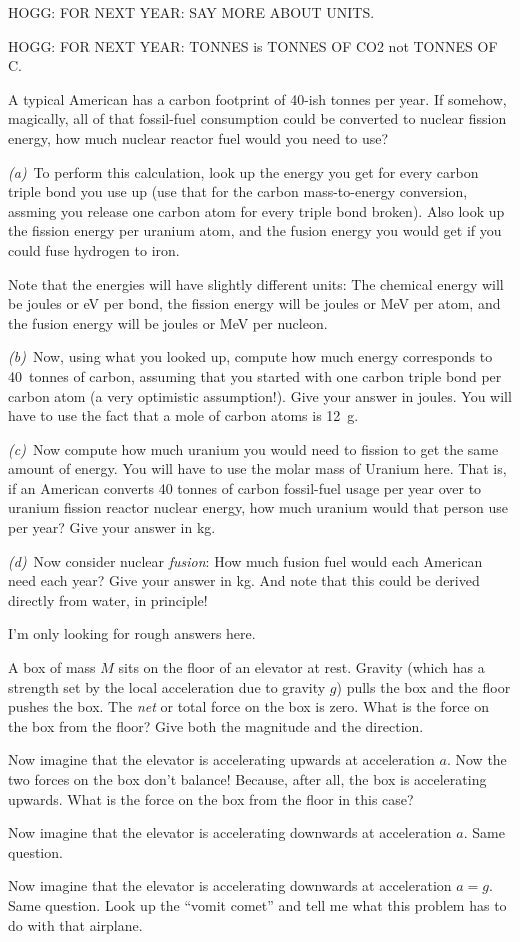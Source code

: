 \documentclass[12pt, letterpaper]{article}
\begin{document}
\begin{problem}
  HOGG: FOR NEXT YEAR: SAY MORE ABOUT UNITS.

  HOGG: FOR NEXT YEAR: TONNES is TONNES OF CO2 not TONNES OF C.

A typical American has a carbon footprint of 40-ish tonnes per year.
If somehow, magically, all of that fossil-fuel consumption could be
converted to nuclear fission energy, how much nuclear reactor fuel
would you need to use?

\textsl{(a)}~To perform this calculation, look up the energy you
get for every carbon triple bond you use up (use that for the carbon
mass-to-energy conversion, assming you release one carbon atom for
every triple bond broken). Also look up the fission energy
per uranium atom, and the fusion energy you would get if you could fuse
hydrogen to iron.

Note that the energies will have slightly different units: The chemical
energy will be joules or eV per bond, the fission energy will be joules
or MeV per atom, and the fusion energy will be joules or MeV per nucleon.

\textsl{(b)}~Now, using what you looked up, compute how much energy
corresponds to 40~tonnes of carbon, assuming that you started with one
carbon triple bond per carbon atom (a very optimistic assumption!).
Give your answer in joules. You will have to use the fact that a mole of
carbon atoms is 12~g.

\textsl{(c)}~Now compute how much uranium you would need to fission to
get the same amount of energy. You will have to use the molar mass of
Uranium here.
That is, if an American converts 40 tonnes of carbon fossil-fuel usage
per year over to uranium fission reactor nuclear energy, how much
uranium would that person use per year? Give your answer in kg.

\textsl{(d)}~Now consider nuclear \emph{fusion}: 
How much fusion fuel would each American need each year? Give your answer
in kg. And note that this could be derived directly from water, in principle!

I'm only looking for rough answers here.
\end{problem}

\begin{problem}
A box of mass $M$ sits on the floor of an elevator at rest. Gravity
(which has a strength set by the local acceleration due to gravity
$g$) pulls the box and the floor pushes the box. The \emph{net} or
total force on the box is zero. What is the force on the box from the
floor? Give both the magnitude and the direction.

Now imagine that the elevator is accelerating upwards at acceleration $a$.
Now the two forces on the box don't balance! Because, after all, the box
is accelerating upwards. What is the force on the box from the floor in this
case?

Now imagine that the elevator is accelerating downwards at acceleration $a$.
Same question.

Now imagine that the elevator is accelerating downwards at acceleration $a = g$.
Same question. Look up the ``vomit comet'' and tell me what this problem has to
do with that airplane.
\end{problem}
\end{document}
